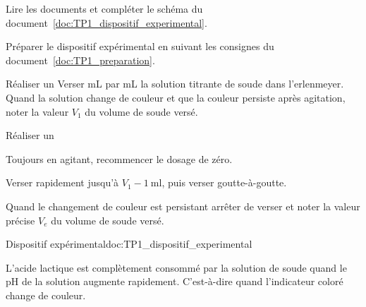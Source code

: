 \numeroQuestion Lire les documents et compléter le schéma du document~\ref{doc:TP1_dispositif_experimental}.

\mesure Préparer le dispositif expérimental en suivant les consignes du document~\ref{doc:TP1_preparation}.

\mesure Réaliser un 
Verser \unit{mL} par \unit{mL} la solution titrante de soude dans l'erlenmeyer.
Quand la solution change de couleur et que la couleur persiste après agitation, noter la valeur $V_1$ du volume de soude versé.

\mesure Réaliser un 
\begin{protocole}
  \item Toujours en agitant, recommencer le dosage de zéro.
  \item Verser rapidement jusqu'à $V_1 - \qty{1}{\ml}$, puis verser goutte-à-goutte.
  \item Quand le changement de couleur est persistant arrêter de verser et noter la valeur précise $V_e$ du volume de soude versé.
\end{protocole}



\begin{doc}{Dispositif expérimental}{doc:TP1_dispositif_experimental}
  \begin{center}
  \end{center}
  
  L'acide lactique est complètement consommé par la solution de soude quand le pH de la solution augmente rapidement.
  C'est-à-dire quand l'indicateur coloré change de couleur.
\end{doc}

